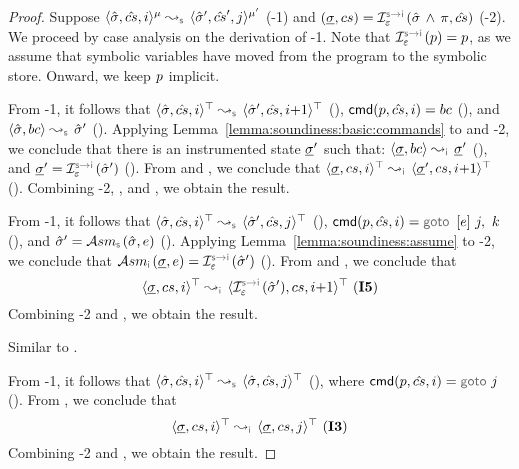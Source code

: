 \begin{proof}
{Suppose $\abssemrule{\sstate, \scs, i}{\sstate', \scs', j}{\mode}{\mode'}{\symbolic}$ (\hyp{1}) and 
$(\istate, \cs) = \interpret{\symbinst}{\senv}(\sstate \, \wedge \, \pc, \scs)$ (\hyp{2})}.
We proceed by case analysis on the derivation of \hyp{1}. Note that $\interpret{\symbinst}{\senv}(\prog) = \prog$, as we assume that symbolic variables have moved from the program to the symbolic store. Onward, we keep $p$ implicit.
\vspace{3pt}

\noindent {} 
From \hyp{1}, it follows that $\abssemrule{\sstate, \scs, i}{\sstate', \scs, i{+}1}{\top}{\top}{\symbolic}$ (), 
$\ccmd[\prog][\scs]{i} = \bcmd$ (), and $\absbsemrule{\sstate, \bcmd}{\sstate'}{\symbolic}$ (). 
Applying Lemma~\ref{lemma:soundiness:basic:commands} to  and \hyp{2}, we conclude that 
there is an instrumented state $\underline{\sigma}'$ such that: 
$\absbsemrule{\istate, \bcmd}{\istate'}{\instrumented}$ (), and $\istate' = \interpret{\symbinst}{\senv}(\sstate')$ (). 
From  and , we conclude that $\abssemrule{\istate, \cs, i}{\istate', \cs, i{+}1}{\top}{\top}{\instrumented}$ (). 
 Combining \hyp{2}, , and , we obtain the result.  
 \vspace{5pt}

\noindent {} 
From \hyp{1}, it follows that $\abssemrule{\sstate, \scs, i}{\sstate', \scs, j}{\top}{\top}{\symbolic}$ (), 
$\ccmd[\prog][\scs]{i} =  \ifgoto{\jsilexpr}{j}{k}$ (), and 
$ \sstate' = \absassume{\symbolic}(\sstate, \jsilexpr)$ (). 
Applying Lemma~\ref{lemma:soundiness:assume} to 
\hyp{2}, we conclude that 
$ \absassume{\instrumented}(\istate, \jsilexpr) = \interpret{\symbinst}{\senv}(\sstate')$ (). 
From  and , we conclude that 
$$\abssemrule{\istate, \cs, i}{\interpret{\symbinst}{\senv}(\sstate'), \cs, i{+}1}{\top}{\top}{\instrumented} \text{ (\ieq{5})}$$
Combining \hyp{2} and , we obtain the result.     
 \vspace{5pt}

\noindent {} Similar to . 
 \vspace{5pt}
 
\noindent {} From \hyp{1}, it follows that $\abssemrule{\sstate, \scs, i}{\sstate, \scs, j}{\top}{\top}{\symbolic}$ (),   
where $\ccmd[\prog][\scs]{i} = \goto \, j$ (). 
From , we conclude that 
$$\abssemrule{\istate, \cs, i}{\istate, \cs, j}{\top}{\top}{\instrumented} \text{ (\ieq{3})}$$
Combining \hyp{2} and , we obtain the result. 
 \vspace{3pt}
 

\end{proof}
